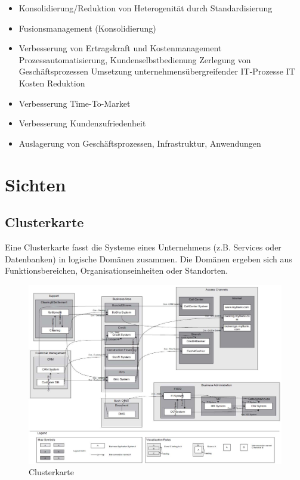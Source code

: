 \begin{itemize}
	\item Konsolidierung/Reduktion von Heterogenität durch Standardisierung
	\item Fusionsmanagement (Konsolidierung)
	\item Verbesserung von Ertragskraft und Kostenmanagement
		\subitem Prozessautomatisierung, Kundenselbstbedienung
		\subitem Zerlegung von Geschäftsprozessen
		\subitem Umsetzung unternehmensübergreifender IT-Prozesse
		\subitem IT Kosten Reduktion
	\item Verbesserung Time-To-Market
	\item Verbesserung Kundenzufriedenheit
	\item Auslagerung von Geschäftsprozessen, Infrastruktur, Anwendungen
\end{itemize}

\section{Sichten}

\subsection{Clusterkarte}

Eine Clusterkarte fasst die Systeme eines Unternehmens (z.B. Services oder Datenbanken) in logische Domänen zusammen. Die Domänen ergeben sich aus Funktionsbereichen, Organisationseinheiten oder Standorten.

\begin{figure}[h!]
\centering
\includegraphics[width=\linewidth]{fig/clusterkarte}
\caption{Clusterkarte}
\label{fig:clusterkarte}
\end{figure}


